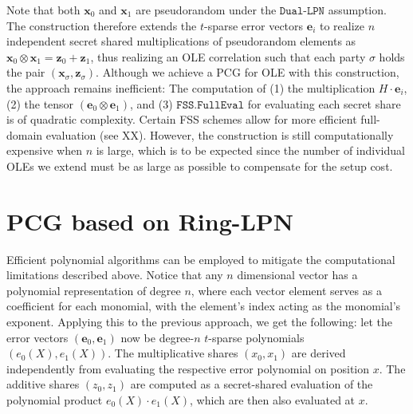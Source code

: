 Note that both $\mathbf{x}_0$ and $\mathbf{x}_1$ are pseudorandom under the $\texttt{Dual-LPN}$ assumption. The construction therefore extends the $t$-sparse error vectors $\mathbf{e}_i$ to realize $n$ independent secret shared multiplications of pseudorandom elements as $\mathbf{x}_0\otimes\mathbf{x}_1=\mathbf{z}_0+\mathbf{z}_1$, thus realizing an OLE correlation such that each party $\sigma$ holds the pair $(\mathbf{x}_\sigma, \mathbf{z}_\sigma)$. Although we achieve a PCG for OLE with this construction, the approach remains inefficient: The computation of (1) the multiplication $H\cdot \mathbf{e}_i$, (2) the tensor $(\mathbf{e}_0 \otimes \mathbf{e}_1)$, and (3) $\texttt{FSS.FullEval}$ for evaluating each secret share is of quadratic complexity. Certain FSS schemes allow for more efficient full-domain evaluation (see XX). However, the construction is still computationally expensive when $n$ is large, which is to be expected since the number of individual OLEs we extend must be as large as possible to compensate for the setup cost.

\section{PCG based on Ring-LPN}
\label{subsec:imrpoved_pcg}
Efficient polynomial algorithms can be employed to mitigate the computational limitations described above. Notice that any $n$ dimensional vector has a polynomial representation of degree \(n\), where each vector element serves as a coefficient for each monomial, with the element's index acting as the monomial's exponent. Applying this to the previous approach, we get the following: let the error vectors $(\mathbf{e}_0, \mathbf{e}_1)$ now be degree-$n$ $t$-sparse polynomials $(e_0(X), e_1(X))$. The multiplicative shares $(x_0, x_1)$ are derived independently from evaluating the respective error polynomial on position $x$. The additive shares $(z_0, z_1)$ are computed as a secret-shared evaluation of the polynomial product $e_0(X)\cdot e_1(X)$, which are then also evaluated at $x$.

